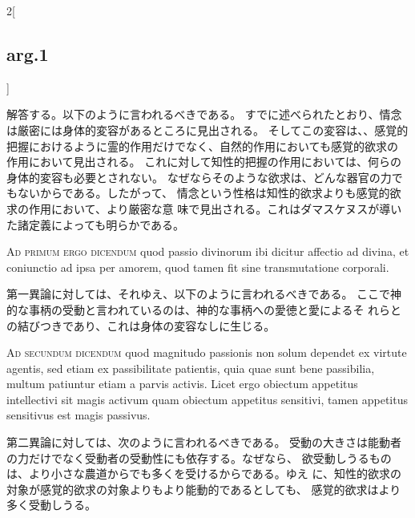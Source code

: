 \documentclass[paper=a4paper,fontsize=10pt,jafontsize=9pt,titlepage]{jlreq}
\begin{document}
\begin{paracol}{2}[\subsection{arg.1}]
\switchcolumn

解答する。以下のように言われるべきである。
すでに述べられたとおり、情念は厳密には身体的変容があるところに見出される。
そしてこの変容は、、感覚的把握におけるように霊的作用だけでなく、自然的作用においても感覚的欲求の
 作用において見出される。
これに対して知性的把握の作用においては、何らの身体的変容も必要とされない。
 なぜならそのような欲求は、どんな器官の力でもないからである。したがって、
 情念という性格は知性的欲求よりも感覚的欲求の作用において、より厳密な意
 味で見出される。これはダマスケヌスが導いた諸定義によっても明らかである。

\switchcolumn*[\subsection{ad.1}]

{\scshape Ad primum ergo dicendum} quod passio divinorum ibi dicitur affectio ad
divina, et coniunctio ad ipsa per amorem, quod tamen fit sine
transmutatione corporali.

\switchcolumn

第一異論に対しては、それゆえ、以下のように言われるべきである。
ここで神的な事柄の受動と言われているのは、神的な事柄への愛徳と愛によるそ
 れらとの結びつきであり、これは身体の変容なしに生じる。

\switchcolumn*[\subsection{ad.2}]

{\scshape Ad secundum dicendum} quod magnitudo passionis non solum dependet ex
virtute agentis, sed etiam ex passibilitate patientis, quia quae sunt
bene passibilia, multum patiuntur etiam a parvis activis. Licet ergo
obiectum appetitus intellectivi sit magis activum quam obiectum
appetitus sensitivi, tamen appetitus sensitivus est magis passivus.

\switchcolumn

第二異論に対しては、次のように言われるべきである。
受動の大きさは能動者の力だけでなく受動者の受動性にも依存する。なぜなら、
 欲受動しうるものは、より小さな農道からでも多くを受けるからである。ゆえ
 に、知性的欲求の対象が感覚的欲求の対象よりもより能動的であるとしても、
 感覚的欲求はより多く受動しうる。

\switchcolumn*[\subsection{ad.3}]


\end{paracol}
\end{document}
